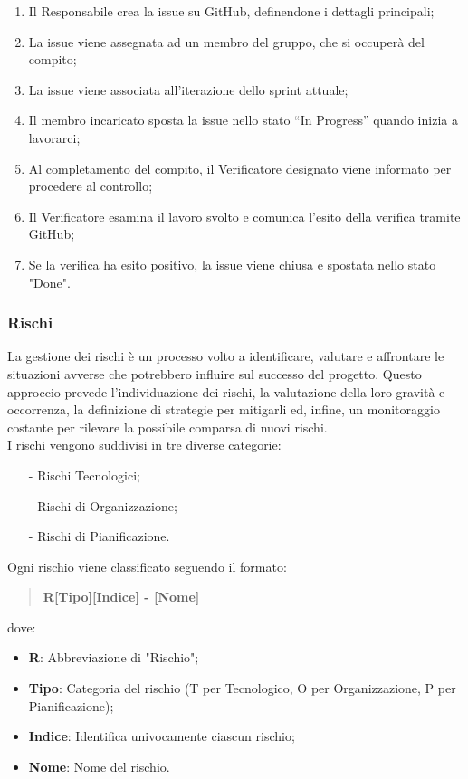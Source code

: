 \documentclass[10pt]{article}
\begin{document}
\begin{justify}
\begin{enumerate}
        \item Il Responsabile crea la issue su GitHub, definendone i dettagli principali;
        \item La issue viene assegnata ad un membro del gruppo, che si occuperà del compito;
        \item La issue viene associata all'iterazione dello sprint attuale;
        \item Il membro incaricato sposta la issue nello stato “In Progress” quando inizia a lavorarci;
        \item Al completamento del compito, il Verificatore designato viene informato per procedere al controllo;
        \item Il Verificatore esamina il lavoro svolto e comunica l'esito della verifica tramite GitHub;
        \item Se la verifica ha esito positivo, la issue viene chiusa e spostata nello stato "Done".
    \end{enumerate}

    \subsubsection{Rischi}
    La gestione dei rischi è un processo volto a identificare, valutare e affrontare le situazioni avverse che potrebbero influire sul successo del progetto. Questo approccio prevede l'individuazione dei rischi, la valutazione della loro gravità e occorrenza, la definizione di strategie per mitigarli ed, infine, un monitoraggio costante per rilevare la possibile comparsa di nuovi rischi.\\
    I rischi vengono suddivisi in tre diverse categorie:
    \begin{itemize}
        \item [-] Rischi Tecnologici;
        \item [-] Rischi di Organizzazione;
        \item [-] Rischi di Pianificazione.
    \end{itemize}
    Ogni rischio viene classificato seguendo il formato:
    \begin{quote}
         \textbf{R[Tipo][Indice] - [Nome]}
    \end{quote}
    dove:
    \begin{itemize}
        \item \textbf{R}: Abbreviazione di "Rischio";
        \item \textbf{Tipo}: Categoria del rischio (T per Tecnologico, O per Organizzazione, P per Pianificazione);
        \item \textbf{Indice}: Identifica univocamente ciascun rischio;
        \item \textbf{Nome}: Nome del rischio.
    \end{itemize}


\end{justify}
\end{document}
